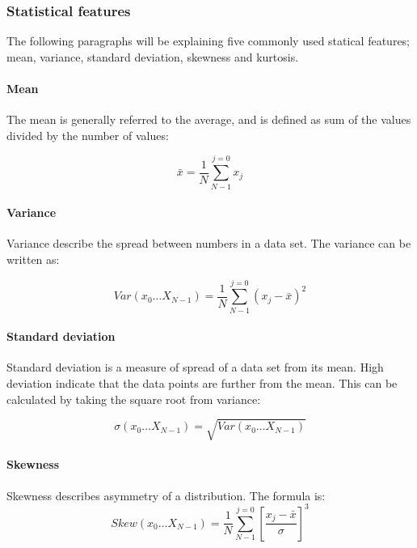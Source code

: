 \documentclass[USenglish]{ifimaster}  %
\begin{document}
\subsubsection{Statistical features} \label{sub:statical}
The following paragraphs will be explaining five commonly used statical features; mean, variance, standard deviation, skewness and kurtosis.
	
\paragraph{Mean}
The mean is generally referred to the average, and is defined as sum of the values divided by the number of values\cite{Press:2007:NRE:1403886}:
	
\begin{equation}
\bar{x} = \frac{1}{N}\sum_{N-1}^{j=0}x_{j}
\label{eq:mean}
\end{equation}
	
	
\paragraph{Variance}
Variance describe the spread between numbers in a data set. The variance can be written as\cite{Press:2007:NRE:1403886}:
	
	\begin{equation}
	Var(x_0\dotsc X_{N-1})  = \frac{1}{N}\sum_{N-1}^{j=0}(x_{j}-\bar{x})^2
	\label{eq:variance}
	\end{equation}

\paragraph{Standard deviation}
Standard deviation is a measure of spread of a data set from its mean. High deviation indicate that the data points are further from the mean. This can be calculated by taking the square root from variance\cite{Press:2007:NRE:1403886}:
	
	\begin{equation}
	\sigma(x_0\dotsc X_{N-1})  = \sqrt{Var(x_0\dotsc X_{N-1})}
	\label{eq:std}
	\end{equation}
	
\paragraph{Skewness} 
Skewness describes asymmetry of a distribution. The formula is\cite{Press:2007:NRE:1403886}:
	\begin{equation}
	Skew(x_0\dotsc X_{N-1})  =  \frac{1}{N}\sum_{N-1}^{j=0}\left [ \frac{x_j-\bar{x}}{\sigma} \right ]^3
	\label{eq:skew}
	\end{equation}
	
\end{document}
